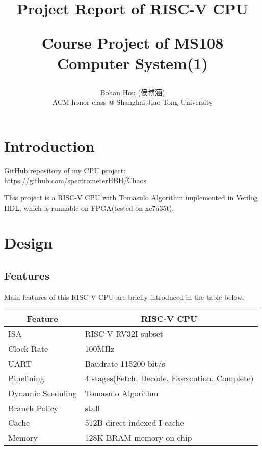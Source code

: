 \documentclass[12pt, a4paper]{article}
\title{Project Report of RISC-V CPU\\\begin{large}Course Project of MS108 Computer System(1)\end{large}}
\author{Bohan Hou (侯博涵)\\ACM honor class @ Shanghai Jiao Tong University}
\date{}
\theoremstyle{margin}
\begin{document}
\maketitle

\section{Introduction}

GitHub repository of my CPU project: \url{https://github.com/spectrometerHBH/Chaos}

This project is a RISC-V CPU with Tomasulo Algorithm implemented in Verilog HDL, which is runnable on FPGA(tested on xc7a35t). 

\section{Design}

\subsection{Features}

Main features of this RISC-V CPU are briefly introduced in the table below.

\begin{table}[H]
\centering
\begin{tabular}{@{}ll@{}}
\toprule
\multicolumn{1}{c}{Feature} & \multicolumn{1}{c}{RISC-V CPU}                                                                        \\ \midrule
ISA                         & RISC-V RV32I subset\\
Clock Rate                  & 100MHz \\
UART                        & Baudrate 115200 bit/s \\
Pipelining                  & 4 stages(Fetch, Decode, Exexcution, Complete) \\
Dynamic Sceduling           & Tomasulo Algorithm \\
Branch Policy               & stall \\
Cache                       & 512B direct indexed I-cache\\
Memory                      & 128K BRAM memory on chip \\ 
\bottomrule
\end{tabular}
\end{table}
\end{document}
